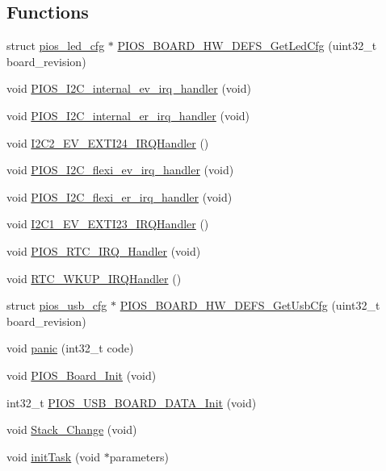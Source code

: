\subsection*{\-Functions}
\begin{DoxyCompactItemize}
\item 
struct \hyperlink{structpios__led__cfg}{pios\-\_\-led\-\_\-cfg} $\ast$ \hyperlink{group___sparky_gafb76ae90816003eabf1d90feff7b1a52}{\-P\-I\-O\-S\-\_\-\-B\-O\-A\-R\-D\-\_\-\-H\-W\-\_\-\-D\-E\-F\-S\-\_\-\-Get\-Led\-Cfg} (uint32\-\_\-t board\-\_\-revision)
\item 
void \hyperlink{group___sparky_gad333f8aeebdfbaca768540198dbc3520}{\-P\-I\-O\-S\-\_\-\-I2\-C\-\_\-internal\-\_\-ev\-\_\-irq\-\_\-handler} (void)
\item 
void \hyperlink{group___sparky_gadc581b03bb219d9dfa3e43f594ae3c94}{\-P\-I\-O\-S\-\_\-\-I2\-C\-\_\-internal\-\_\-er\-\_\-irq\-\_\-handler} (void)
\item 
void \hyperlink{group___sparky_ga860bdffadc546e3969c31b9b00c5d29c}{\-I2\-C2\-\_\-\-E\-V\-\_\-\-E\-X\-T\-I24\-\_\-\-I\-R\-Q\-Handler} ()
\item 
void \hyperlink{group___sparky_gaefc76aa2d7a356754078bf406c1a265c}{\-P\-I\-O\-S\-\_\-\-I2\-C\-\_\-flexi\-\_\-ev\-\_\-irq\-\_\-handler} (void)
\item 
void \hyperlink{group___sparky_gaad97494bbf04b2aeb846abc2588dcded}{\-P\-I\-O\-S\-\_\-\-I2\-C\-\_\-flexi\-\_\-er\-\_\-irq\-\_\-handler} (void)
\item 
void \hyperlink{group___sparky_ga40edacd7797186e686829d1c3b43f4bc}{\-I2\-C1\-\_\-\-E\-V\-\_\-\-E\-X\-T\-I23\-\_\-\-I\-R\-Q\-Handler} ()
\item 
void \hyperlink{group___sparky_gadc73bf2eccd9d9ff9d8efedd1e743704}{\-P\-I\-O\-S\-\_\-\-R\-T\-C\-\_\-\-I\-R\-Q\-\_\-\-Handler} (void)
\item 
void \hyperlink{group___sparky_ga7e78266985c97f3b7e8a9f91893657d1}{\-R\-T\-C\-\_\-\-W\-K\-U\-P\-\_\-\-I\-R\-Q\-Handler} ()
\item 
struct \hyperlink{structpios__usb__cfg}{pios\-\_\-usb\-\_\-cfg} $\ast$ \hyperlink{group___sparky_ga9075152ece4596f99329ba0bc3866dc9}{\-P\-I\-O\-S\-\_\-\-B\-O\-A\-R\-D\-\_\-\-H\-W\-\_\-\-D\-E\-F\-S\-\_\-\-Get\-Usb\-Cfg} (uint32\-\_\-t board\-\_\-revision)
\item 
void \hyperlink{group___sparky_ga0e4330d8eb474f118a0acaff588a8c30}{panic} (int32\-\_\-t code)
\item 
void \hyperlink{group___sparky_ga902009c5b1cb57d9f9d60092eb7cacfb}{\-P\-I\-O\-S\-\_\-\-Board\-\_\-\-Init} (void)
\item 
int32\-\_\-t \hyperlink{group___sparky_ga5efd94ab761f254827f38dba474cf642}{\-P\-I\-O\-S\-\_\-\-U\-S\-B\-\_\-\-B\-O\-A\-R\-D\-\_\-\-D\-A\-T\-A\-\_\-\-Init} (void)
\item 
void \hyperlink{group___sparky_ga7a789e7b91612099a4a1f355b9e97c24}{\-Stack\-\_\-\-Change} (void)
\item 
void \hyperlink{group___sparky_gae7ecc4ed0ea5858477b78acaf928c3ef}{init\-Task} (void $\ast$parameters)
\end{DoxyCompactItemize}
